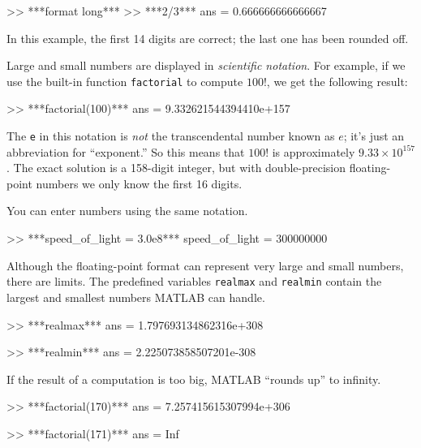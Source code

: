 
\begin{code}
>> ***format long***
>> ***2/3***
ans = 0.666666666666667
\end{code}

In this example, the first 14 digits are correct; the last one has been rounded off.


Large and small numbers are displayed in {\em scientific notation}. 
For example, if we use the built-in function \lstinline{factorial} to compute $100!$, we get the following result:

\begin{code}
>> ***factorial(100)***
ans = 9.332621544394410e+157
\end{code}

The {\tt e} in this notation is {\em not} the transcendental number
known as $e$; it's just an abbreviation for ``exponent.''  So
this means that $100!$ is approximately $9.33 \times 10^{157}$.  The
exact solution is a 158-digit integer, but with double-precision floating-point numbers we only know the first 16 digits.


You can enter numbers using the same notation.

\begin{code}
>> ***speed_of_light = 3.0e8***
speed_of_light = 300000000
\end{code}

Although the floating-point format can represent very large and small numbers, 
there are limits.  
The predefined variables \lstinline{realmax} and \lstinline{realmin}
contain the largest and smallest numbers MATLAB 
can handle.


\begin{code}
>> ***realmax***
ans = 1.797693134862316e+308

>> ***realmin***
ans = 2.225073858507201e-308
\end{code}

If the result of a computation is too big, MATLAB ``rounds up''
to infinity.


\begin{code}
>> ***factorial(170)***
ans = 7.257415615307994e+306

>> ***factorial(171)***
ans = Inf
\end{code}

